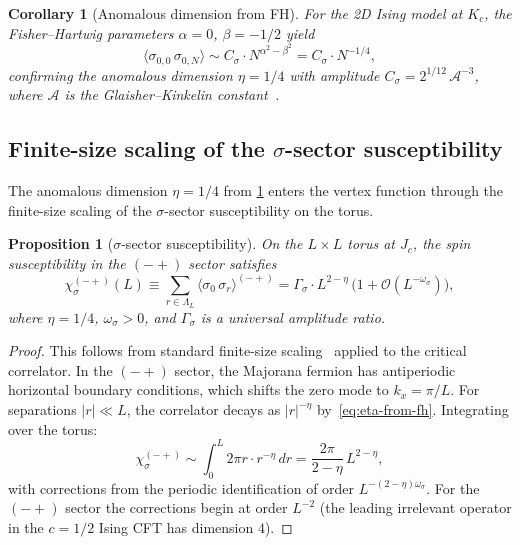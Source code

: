 \documentclass[11pt]{article}
\newtheorem{proposition}[theorem]{Proposition}
\newtheorem{corollary}[theorem]{Corollary}
\theoremstyle{definition}
\theoremstyle{remark}
\newcommand{\Jc}{J_c}
\newcommand{\cO}{\mathcal{O}}
\newcommand{\cA}{\mathcal{A}}
\begin{document}
\begin{corollary}[Anomalous dimension from FH]
\label{cor:eta-from-fh}
For the 2D Ising model at $K_c$, the Fisher--Hartwig
parameters $\alpha = 0$, $\beta = -1/2$ yield
\begin{equation}
  \langle\sigma_{0,0}\,\sigma_{0,N}\rangle
    \sim C_\sigma \cdot N^{\alpha^2 - \beta^2}
    = C_\sigma \cdot N^{-1/4},
  \label{eq:eta-from-fh}
\end{equation}
confirming the anomalous dimension $\eta = 1/4$ with amplitude
$C_\sigma = 2^{1/12}\,\cA^{-3}$, where $\cA$ is the
Glaisher--Kinkelin constant~\cite{McCoyWu1973,TracyWidom1994}.
\end{corollary}


\subsection{Finite-size scaling of the $\sigma$-sector susceptibility}
\label{subsec:fss-sigma}

The anomalous dimension $\eta = 1/4$ from
\cref{cor:eta-from-fh} enters the vertex function through the
finite-size scaling of the $\sigma$-sector susceptibility on the
torus.

\begin{proposition}[$\sigma$-sector susceptibility]
\label{prop:chi-sigma}
On the $L \times L$ torus at $\Jc$, the spin susceptibility
in the $(-+)$ sector satisfies
\begin{equation}
  \chi_\sigma^{(-+)}(L) \equiv
    \sum_{r \in \Lambda_L}
    \langle\sigma_0\,\sigma_r\rangle^{(-+)}
    = \Gamma_\sigma \cdot L^{2-\eta}\,
    \bigl(1 + \cO(L^{-\omega_\sigma})\bigr),
  \label{eq:chi-sigma-fss}
\end{equation}
where $\eta = 1/4$, $\omega_\sigma > 0$, and
$\Gamma_\sigma$ is a universal amplitude ratio.
\end{proposition}

\begin{proof}
This follows from standard finite-size
scaling~\cite{Privman1990,CardyBook1996} applied to the
critical correlator. In the $(-+)$ sector, the Majorana fermion
has antiperiodic horizontal boundary conditions, which shifts the
zero mode to $k_x = \pi/L$. For separations $|r| \ll L$, the
correlator decays as $|r|^{-\eta}$ by~\eqref{eq:eta-from-fh}.
Integrating over the torus:
\[
  \chi_\sigma^{(-+)} \sim \int_0^L 2\pi r \cdot r^{-\eta}\,dr
    = \frac{2\pi}{2 - \eta}\,L^{2-\eta},
\]
with corrections from the periodic identification of
order $L^{-(2-\eta)\omega_\sigma}$. For the $(-+)$ sector
the corrections begin at order $L^{-2}$ (the leading irrelevant
operator in the $c = 1/2$ Ising CFT has dimension $4$).
\end{proof}
\end{document}
